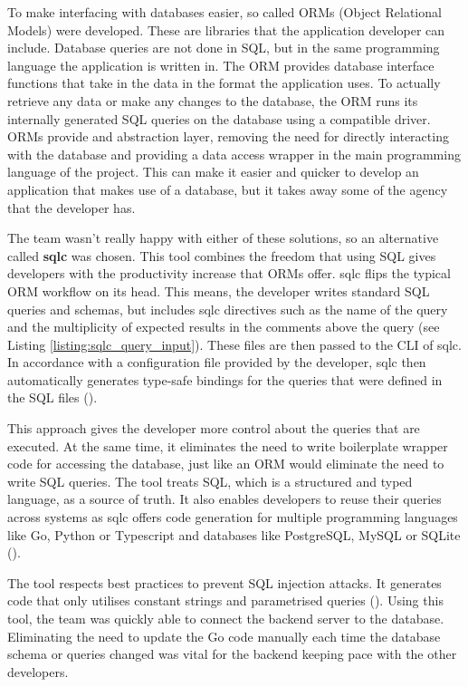 To make interfacing with databases easier, so called ORMs (Object Relational
Models) were developed. These are libraries that the application developer can
include. Database queries are not done in SQL, but in the same programming
language the application is written in. The ORM provides database interface
functions that take in the data in the format the application uses. To actually
retrieve any data or make any changes to the database, the ORM runs its
internally generated SQL queries on the database using a compatible driver. ORMs
provide and abstraction layer, removing the need for directly interacting with
the database and providing a data access wrapper in the main programming
language of the project. This can make it easier and quicker to develop an
application that makes use of a database, but it takes away some of the agency
that the developer has.

The team wasn't really happy with either of these solutions, so an alternative
called \textbf{sqlc} was chosen. This tool combines the freedom that using SQL gives
developers with the productivity increase that ORMs offer. sqlc flips the
typical ORM workflow on its head. This means, the developer writes standard SQL
queries and schemas, but includes sqlc directives such as the name of the query
and the multiplicity of expected results in the comments above the query (see
Listing \ref{listing:sqlc_query_input}). These files are then passed to the CLI
of sqlc. In accordance with a configuration file provided by the developer, sqlc
then automatically generates type-safe bindings for the queries that were
defined in the SQL files (\cite{sqlc_introduction}).

This approach gives the developer more control about the queries that are
executed. At the same time, it eliminates the need to write boilerplate wrapper
code for accessing the database, just like an ORM would eliminate the need to
write SQL queries. The tool treats SQL, which is a structured and typed
language, as a source of truth. It also enables developers to reuse their
queries across systems as sqlc offers code generation for multiple programming
languages like Go, Python or Typescript and databases like PostgreSQL, MySQL or
SQLite (\cite{sqlc_documentation_language_support}).

The tool respects best practices to prevent SQL injection attacks. It generates
code that only utilises constant strings and parametrised queries
(\cite{sqlc_injection}). Using this tool, the team was quickly able to
connect the backend server to the database. Eliminating the need to update the
Go code manually each time the database schema or queries changed was vital for
the backend keeping pace with the other developers.


